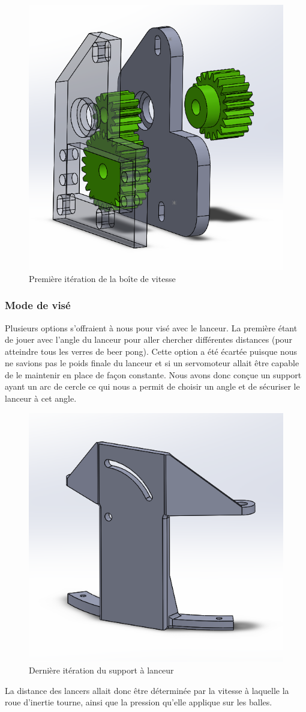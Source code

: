\begin{figure}[h!]
    \centering
    \includegraphics[width=0.4\linewidth]{img/s2/cad/gearbox1}
    \caption{Première itération de la boîte de vitesse}
    \label{fig:s2-cad-gearbox1}
\end{figure}

\subsubsection{Mode de visé}
Plusieurs options s’offraient à nous pour visé avec le lanceur.
La première étant de jouer avec l’angle du lanceur pour aller chercher différentes distances (pour atteindre tous les verres de beer pong).
Cette option a été écartée puisque nous ne savions pas le poids finale du lanceur et si un servomoteur allait être capable de le maintenir en place de façon constante.
Nous avons donc conçue un support ayant un arc de cercle ce qui nous a permit de choisir un angle et de sécuriser le lanceur à cet angle.

\begin{figure}[h!]
    \centering
    \includegraphics[width=0.4\linewidth]{img/s2/cad/support}
    \caption{Dernière itération du support à lanceur}
    \label{fig:s2-cad-support}
\end{figure}

La distance des lancers allait donc être déterminée par la vitesse à laquelle la roue d’inertie tourne, ainsi que la pression qu’elle applique sur les balles.

